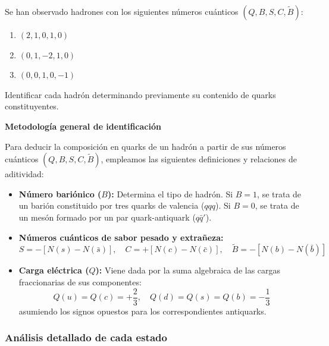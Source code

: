 \newpage
\begin{problema}
Se han observado hadrones con los siguientes números cuánticos $(Q, B, S, C, \tilde{B})$:
\begin{enumerate}[label=\alph*)]
    \item $(2, 1, 0, 1, 0)$
    \item $(0, 1, -2, 1, 0)$
    \item $(0, 0, 1, 0, -1)$
\end{enumerate}
Identificar cada hadrón determinando previamente su contenido de quarks constituyentes.

\tcblower

\textbf{Metodología general de identificación}

Para deducir la composición en quarks de un hadrón a partir de sus números cuánticos $(Q, B, S, C, \tilde{B})$, empleamos las siguientes definiciones y relaciones de aditividad:
\begin{itemize}
    \item \textbf{Número bariónico ($B$):} Determina el tipo de hadrón. Si $B = 1$, se trata de un barión constituido por tres quarks de valencia ($qqq$). Si $B = 0$, se trata de un mesón formado por un par quark-antiquark ($q\bar{q}'$).
    \item \textbf{Números cuánticos de sabor pesado y extrañeza:}
    \begin{equation*}
        S = -[N(s) - N(\bar{s})], \quad C = +[N(c) - N(\bar{c})], \quad \tilde{B} = -[N(b) - N(\bar{b})]
    \end{equation*}
    \item \textbf{Carga eléctrica ($Q$):} Viene dada por la suma algebraica de las cargas fraccionarias de sus componentes:
    \begin{equation*}
        Q(u) = Q(c) = +\frac{2}{3}, \quad Q(d) = Q(s) = Q(b) = -\frac{1}{3}
    \end{equation*}
    asumiendo los signos opuestos para los correspondientes antiquarks.
\end{itemize}

\subsubsection*{Análisis detallado de cada estado}


\end{problema}
